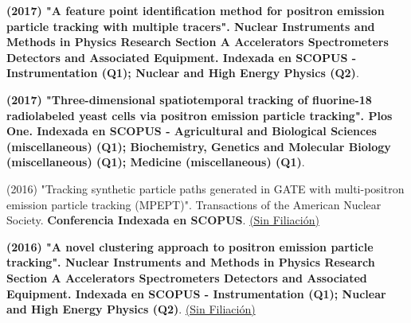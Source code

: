 {\item \textbf{(2017) "A feature point identification method for positron emission particle tracking with multiple tracers". Nuclear Instruments and Methods in Physics Research Section A Accelerators Spectrometers Detectors and Associated Equipment. Indexada en SCOPUS - Instrumentation (Q1); Nuclear and High Energy Physics (Q2)}.
\item \textbf{(2017) "Three-dimensional spatiotemporal tracking of fluorine-18 radiolabeled yeast cells via positron emission particle tracking". Plos One. Indexada en SCOPUS - Agricultural and Biological Sciences (miscellaneous) (Q1); Biochemistry, Genetics and Molecular Biology (miscellaneous) (Q1); Medicine (miscellaneous) (Q1)}.
\item (2016) "Tracking synthetic particle paths generated in GATE with multi-positron emission particle tracking (MPEPT)". Transactions of the American Nuclear Society. \textbf{Conferencia Indexada en SCOPUS}. \underline{(Sin Filiación)}
\item \textbf{(2016) "A novel clustering approach to positron emission particle tracking". Nuclear Instruments and Methods in Physics Research Section A Accelerators Spectrometers Detectors and Associated Equipment. Indexada en SCOPUS - Instrumentation (Q1); Nuclear and High Energy Physics (Q2)}. \underline{(Sin Filiación)}









}


\newcommand{\numpublicacionesWos}{0 }
\newcommand{\distribucionArticulosWos}{1 Artículo y 5 Artículos de Conferencias }

